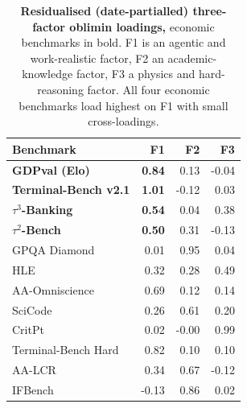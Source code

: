 \begin{table}[!tb]
\centering
\caption[Residualised three-factor loadings]{\textbf{Residualised (date-partialled) three-factor oblimin loadings,} economic benchmarks in
bold. F1 is an agentic and work-realistic factor, F2 an academic-knowledge factor, F3 a
physics and hard-reasoning factor. All four economic benchmarks load highest on F1 with small
cross-loadings.}
\label{tab:loadings}
\small
\begin{tabular}{@{}lrrr@{}}
\toprule
Benchmark & F1 & F2 & F3 \\
\midrule
\textbf{GDPval (Elo)} & \textbf{0.84} & 0.13 & -0.04 \\
\textbf{Terminal-Bench v2.1} & \textbf{1.01} & -0.12 & 0.03 \\
\textbf{$\tau^3$-Banking} & \textbf{0.54} & 0.04 & 0.38 \\
\textbf{$\tau^2$-Bench} & \textbf{0.50} & 0.31 & -0.13 \\
GPQA Diamond & 0.01 & 0.95 & 0.04 \\
HLE & 0.32 & 0.28 & 0.49 \\
AA-Omniscience & 0.69 & 0.12 & 0.14 \\
SciCode & 0.26 & 0.61 & 0.20 \\
CritPt & 0.02 & -0.00 & 0.99 \\
Terminal-Bench Hard & 0.82 & 0.10 & 0.10 \\
AA-LCR & 0.34 & 0.67 & -0.12 \\
IFBench & -0.13 & 0.86 & 0.02 \\
\bottomrule
\end{tabular}
\end{table}
